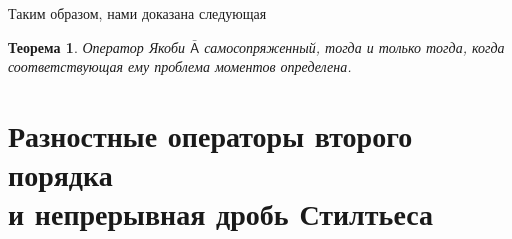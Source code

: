 \documentclass[12 pt, a4 paper]{article}
\theoremstyle{plain}   \newtheorem{Pro}{Задача}
\newtheorem{The}{Теорема}
\begin{document}
Таким образом, нами доказана следующая
\begin{The}
Оператор Якоби
$ \bar{\mathsf{A}} $
самосопряженный, тогда и только тогда, когда
соответствующая ему проблема моментов определена.
\end{The}
\newpage
\section{Разностные операторы второго порядка\\
и непрерывная дробь Стилтьеса}
\end{document}
